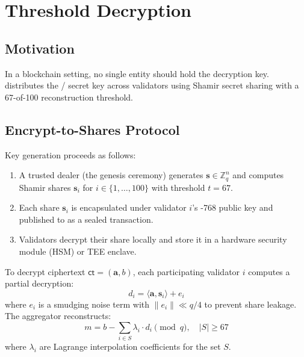 \section{Threshold Decryption}

\label{sec:threshold}

\subsection{Motivation}

In a blockchain setting, no single entity should hold the decryption key. \Zoo{} distributes the \TFHE{}/\CKKS{} secret key across validators using Shamir secret sharing with a 67-of-100 reconstruction threshold.

\subsection{Encrypt-to-Shares Protocol}

Key generation proceeds as follows:

\begin{enumerate}
  \item A trusted dealer (the genesis ceremony) generates $\mathbf{s} \in \mathbb{Z}_q^n$ and computes Shamir shares $\mathbf{s}_i$ for $i \in \{1, \ldots, 100\}$ with threshold $t = 67$.
  \item Each share $\mathbf{s}_i$ is encapsulated under validator $i$'s \MLKEM{}-768 public key and published to \Lux{} \KChain{} as a sealed transaction.
  \item Validators decrypt their share locally and store it in a hardware security module (HSM) or TEE enclave.
\end{enumerate}

\begin{definition}[E2S Decryption]
To decrypt ciphertext $\mathsf{ct} = (\mathbf{a}, b)$, each participating validator $i$ computes a partial decryption:
\begin{equation}
  d_i = \langle \mathbf{a}, \mathbf{s}_i \rangle + e_i
\end{equation}
where $e_i$ is a smudging noise term with $\|e_i\| \ll q/4$ to prevent share leakage. The aggregator reconstructs:
\begin{equation}
  m = b - \sum_{i \in S} \lambda_i \cdot d_i \pmod{q}, \quad |S| \geq 67
\end{equation}
where $\lambda_i$ are Lagrange interpolation coefficients for the set $S$.
\end{definition}

